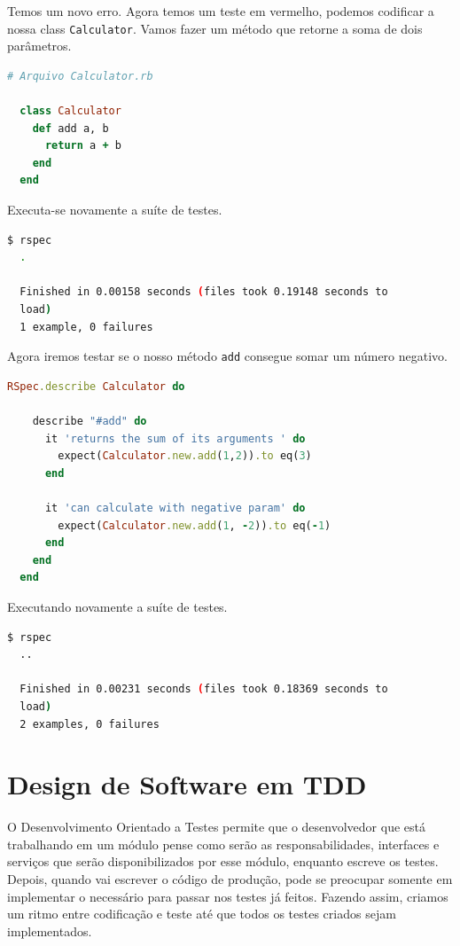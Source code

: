 \documentclass[12pt]{article}
\newcommand{\code}[1]{\texttt{#1}}
\begin{document}
  Temos um novo erro. Agora temos um teste em vermelho, podemos codificar a
  nossa class \code{Calculator}. Vamos fazer um método que retorne a soma de
  dois parâmetros.

  \begin{lstlisting}[language=Ruby]
  # Arquivo Calculator.rb

  class Calculator
    def add a, b
      return a + b
    end
  end
  \end{lstlisting}

  Executa-se novamente a suíte de testes.

  \begin{lstlisting}[language=bash]
  $ rspec
  .

  Finished in 0.00158 seconds (files took 0.19148 seconds to 
  load)
  1 example, 0 failures
  \end{lstlisting}

  Agora iremos testar se o nosso método \code{add} consegue somar um número
  negativo.

  \begin{lstlisting}[language=Ruby]
  RSpec.describe Calculator do

    describe "#add" do
      it 'returns the sum of its arguments ' do
        expect(Calculator.new.add(1,2)).to eq(3)
      end

      it 'can calculate with negative param' do
        expect(Calculator.new.add(1, -2)).to eq(-1)
      end
    end
  end
  \end{lstlisting}

  Executando novamente a suíte de testes.

  \begin{lstlisting}[language=bash]
  $ rspec
  ..

  Finished in 0.00231 seconds (files took 0.18369 seconds to 
  load)
  2 examples, 0 failures
  \end{lstlisting}

  \section{Design de Software em TDD}

  O Desenvolvimento Orientado a Testes permite que o desenvolvedor que está 
  trabalhando 
  em um módulo pense como serão as responsabilidades, interfaces e serviços que 
  serão disponibilizados por esse módulo, enquanto escreve os testes. 
  Depois, quando vai escrever o código de produção, pode se preocupar somente em
  implementar o necessário para passar nos testes já feitos. Fazendo assim, 
  criamos um ritmo entre codificação e teste até que todos os testes criados 
  sejam implementados.
\end{document}
